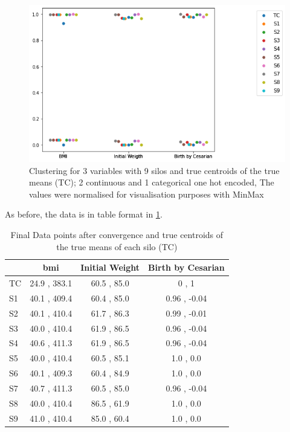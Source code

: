 


\begin{figure}[H]
\centering
\captionsetup{justification=centering}
\caption[Clustering for 3 variables with 9 silos]{Clustering for 3 variables with 9 silos and true centroids of the true means (TC); 2 continuous and 1 categorical one hot encoded, The values were normalised for visualisation purposes with MinMax}\label{fig:cluster_mydata_9s} 
\includegraphics[scale=0.60]{figures/my_cluster_9.png}
\end{figure}

As before, the data is in table format in \ref{tab:datapoints_9}.


\begin{table}[htbp]
\centering
 \setlength{\tabcolsep}{7pt} %
 \renewcommand{\arraystretch}{1.35} %
  \captionsetup{justification=centering} 
\caption{Final Data points after convergence and true centroids of the true means of each silo (TC)}
\label{tab:datapoints_9}
\begin{tabular}{lccc}
\toprule
 & \acs{bmi} & Initial Weight & Birth by Cesarian \\
\midrule
TC & 24.9 , 383.1 & 60.5 , 85.0  & 0 , 1 \\
S1 & 40.1 , 409.4 & 60.4 , 85.0 & 0.96 , -0.04 \\
S2 & 40.1 , 410.4 & 61.7 , 86.3 & 0.99 , -0.01 \\
S3 & 40.0 , 410.4 & 61.9 , 86.5 & 0.96 , -0.04 \\
S4 & 40.6 , 411.3 & 61.9 , 86.5 & 0.96 , -0.04 \\
S5 & 40.0 , 410.4 & 60.5 , 85.1 & 1.0 , 0.0 \\
S6 & 40.1 , 409.3 & 60.4 , 84.9 & 1.0 , 0.0 \\
S7 & 40.7 , 411.3 & 60.5 , 85.0 & 0.96 , -0.04 \\
S8 & 40.0 , 410.4 & 86.5 , 61.9 & 1.0 , 0.0 \\
S9 & 41.0 , 410.4 & 85.0 , 60.4 & 1.0 , 0.0 \\
\bottomrule
\end{tabular}
\end{table}




